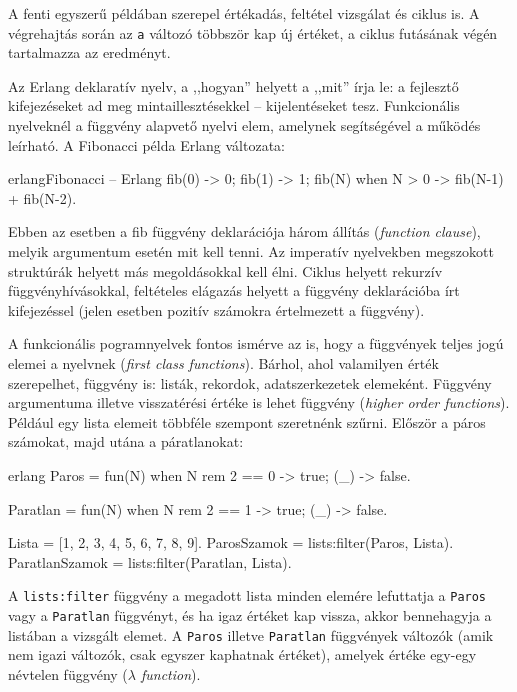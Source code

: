 \documentclass[12pt, a4paper, oneside]{book}
\begin{document}
A fenti egyszerű példában szerepel értékadás, feltétel vizsgálat és ciklus is.
A végrehajtás során az \texttt{a} változó többször kap új értéket, a ciklus futásának
végén tartalmazza az eredményt.

Az Erlang deklaratív nyelv, a ,,hogyan'' helyett a ,,mit'' írja le: a fejlesztő
kifejezéseket ad meg mintaillesztésekkel -- kijelentéseket tesz. Funkcionális
nyelveknél a függvény alapvető nyelvi elem, amelynek segítségével a működés
leírható. A Fibonacci példa Erlang változata:

\begin{code}{erlang}{Fibonacci -- Erlang}
fib(0) -> 0; 
fib(1) -> 1; 
fib(N) when N > 0 -> fib(N-1) + fib(N-2).  
\end{code} 

Ebben az esetben a fib függvény deklarációja három állítás
(\emph{function clause}), melyik argumentum esetén mit kell tenni. Az imperatív
nyelvekben megszokott struktúrák helyett más megoldásokkal kell élni. Ciklus
helyett rekurzív függvényhívásokkal, feltételes elágazás helyett a függvény
deklarációba írt kifejezéssel (jelen esetben pozitív számokra értelmezett a
függvény).

A funkcionális pogramnyelvek fontos ismérve az is, hogy a függvények teljes jogú
elemei a nyelvnek (\emph{first class functions}). Bárhol, ahol valamilyen érték
szerepelhet, függvény is: listák, rekordok, adatszerkezetek elemeként. Függvény
argumentuma illetve visszatérési értéke is lehet függvény (\emph{higher order
functions}). Például egy lista elemeit többféle szempont szeretnénk szűrni.
Először a páros számokat, majd utána a páratlanokat:

\begin{code}{erlang}{}
Paros = fun(N) when N rem 2 == 0 -> true;
           (_)                   -> false.

Paratlan = fun(N) when N rem 2 == 1 -> true;
              (_)                   -> false.


Lista = [1, 2, 3, 4, 5, 6, 7, 8, 9].
ParosSzamok = lists:filter(Paros, Lista).
ParatlanSzamok = lists:filter(Paratlan, Lista).
\end{code}

A \texttt{lists:filter} függvény a megadott lista minden elemére lefuttatja a
\texttt{Paros} vagy a \texttt{Paratlan} függvényt, és ha igaz értéket kap
vissza, akkor bennehagyja a listában a vizsgált elemet. A \texttt{Paros}
illetve \texttt{Paratlan} függvények változók (amik nem igazi változók, csak
egyszer kaphatnak értéket), amelyek értéke egy-egy névtelen függvény
(\emph{$\lambda$ function}).
\end{document}
